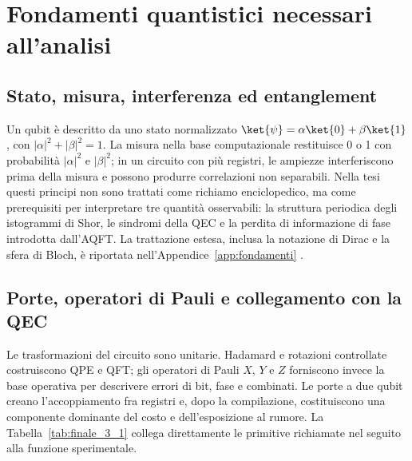 
\section{Fondamenti quantistici necessari all'analisi}\label{sec:finale_3_1}

\subsection{Stato, misura, interferenza ed entanglement}\label{sec:finale_3_1_1}

Un qubit è descritto da uno stato normalizzato $\ket{\psi}=\alpha\ket{0}+\beta\ket{1}$, con $|\alpha|^2+|\beta|^2=1$. La misura nella base computazionale restituisce 0 o 1 con probabilità $|\alpha|^2$ e $|\beta|^2$; in un circuito con più registri, le ampiezze interferiscono prima della misura e possono produrre correlazioni non separabili. Nella tesi questi principi non sono trattati come richiamo enciclopedico, ma come prerequisiti per interpretare tre quantità osservabili: la struttura periodica degli istogrammi di Shor, le sindromi della QEC e la perdita di informazione di fase introdotta dall'AQFT. La trattazione estesa, inclusa la notazione di Dirac e la sfera di Bloch, è riportata nell'Appendice~\ref{app:fondamenti} \cite{nielsenChuang2000,wootters1982}.

\subsection{Porte, operatori di Pauli e collegamento con la QEC}\label{sec:finale_3_1_2}

Le trasformazioni del circuito sono unitarie. Hadamard e rotazioni controllate costruiscono QPE e QFT; gli operatori di Pauli $X$, $Y$ e $Z$ forniscono invece la base operativa per descrivere errori di bit, fase e combinati. Le porte a due qubit creano l'accoppiamento fra registri e, dopo la compilazione, costituiscono una componente dominante del costo e dell'esposizione al rumore. La Tabella~\ref{tab:finale_3_1} collega direttamente le primitive richiamate nel seguito alla funzione sperimentale.

